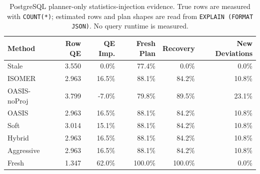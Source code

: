\begin{table}[t]
  \centering
  \small
  \caption{PostgreSQL planner-only statistics-injection evidence. True rows are measured with \texttt{COUNT(*)}; estimated rows and plan shapes are read from \texttt{EXPLAIN (FORMAT JSON)}. No query runtime is measured.}
  \label{tab:postgres_planner_stats_injection}
  \setlength{\tabcolsep}{4pt}
  \begin{tabular}{lrrrrr}
    \toprule
    Method & Row QE & QE Imp. & Fresh Plan & Recovery & New Deviations \\
    \midrule
    Stale & 3.550 & 0.0\% & 77.4\% & 0.0\% & 0.0\% \\
    ISOMER & 2.963 & 16.5\% & 88.1\% & 84.2\% & 10.8\% \\
    OASIS-noProj & 3.799 & -7.0\% & 79.8\% & 89.5\% & 23.1\% \\
    OASIS & 2.963 & 16.5\% & 88.1\% & 84.2\% & 10.8\% \\
    Soft & 3.014 & 15.1\% & 88.1\% & 84.2\% & 10.8\% \\
    Hybrid & 2.963 & 16.5\% & 88.1\% & 84.2\% & 10.8\% \\
    Aggressive & 2.963 & 16.5\% & 88.1\% & 84.2\% & 10.8\% \\
    Fresh & 1.347 & 62.0\% & 100.0\% & 100.0\% & 0.0\% \\
    \bottomrule
  \end{tabular}
\end{table}
